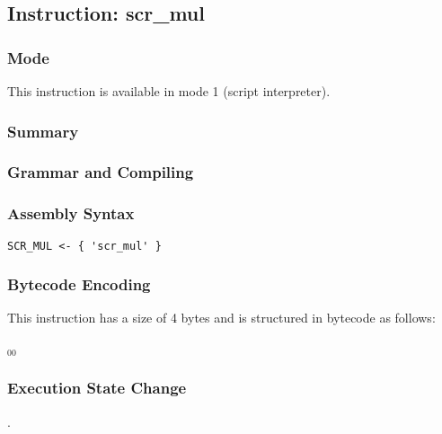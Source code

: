 \subsection{Instruction: scr\_mul}

\subsubsection{Mode}
This instruction is available in mode 1 (script interpreter).
\subsubsection{Summary}


\subsubsection{Grammar and Compiling}


\subsubsection{Assembly Syntax}

\begin{myquote}
\begin{verbatim}
SCR_MUL <- { 'scr_mul' }
\end{verbatim}
\end{myquote}

\subsubsection{Bytecode Encoding}

This instruction has a size of 4 bytes and is structured in bytecode as follows:

$_{00}$\ 


\subsubsection{Execution State Change}

.


